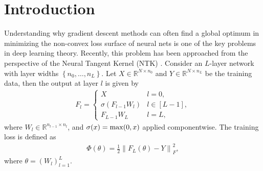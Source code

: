 \documentclass{article}
\def\RR{\mathbb{R}}
\def\Set#1{\left\{ #1 \right\}}
\newcommand{\norm}[1]{\left\|#1\right\|}
\def\max{\mathop{\rm max}\nolimits}
\begin{document}
\section{Introduction}
Understanding why gradient descent methods can often find a global optimum in minimizing the non-convex loss surface of neural nets 
is one of the key problems in deep learning theory.
Recently, this problem has been approached from the perspective of the Neural Tangent Kernel (NTK) \cite{JacotEtc2018}.
Consider an $L$-layer network with layer widths $\Set{n_0,\ldots,n_{L}}.$
Let $X\in\RR^{N\times n_0}$ and $Y\in\RR^{N\times n_L}$ be the training data, then the output at layer $l$ is given by
\begin{align}\label{eq:def_feature_map}
    F_l=\begin{cases}
	    X & l=0,\\
	    \sigma(F_{l-1}W_l) & l\in[L-1],\\
	    F_{L-1} W_L & l=L, 
        \end{cases}
\end{align}
where $W_l\in\RR^{n_{l-1}\times n_l}$, and $\sigma(x)=\max(0,x)$ applied componentwise.
The training loss is defined as
\begin{align*}
    \Phi(\theta) = \frac{1}{2}\norm{F_L(\theta)-Y}_F^2,
\end{align*}
where $\theta=(W_l)_{l=1}^{L}.$
\end{document}
